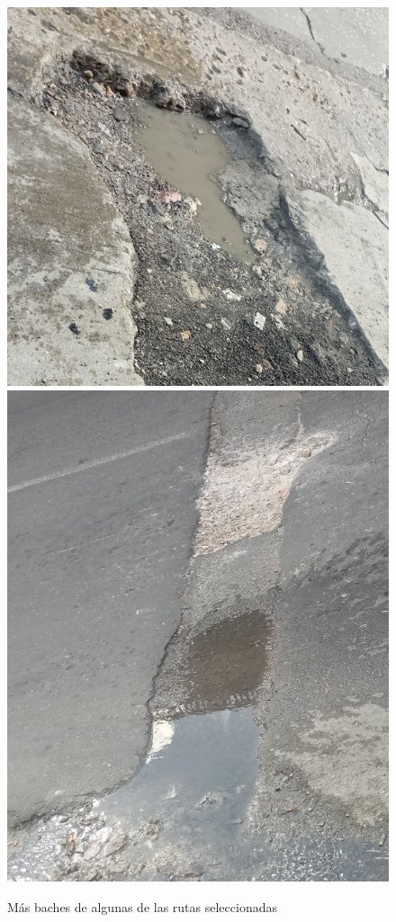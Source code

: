 \begin{appendices}
		\newpage
		\begin{figure}[htb]
			\centering
			\includegraphics[scale = 0.3]{Graphics/pothole_1.jpg}
			\includegraphics[scale = 0.3]{Graphics/pothole_2.jpg}
			\caption{Más baches de algunas de las rutas seleccionadas}
			\label{fig:18}
		\end{figure}
		\newpage


\end{appendices}
